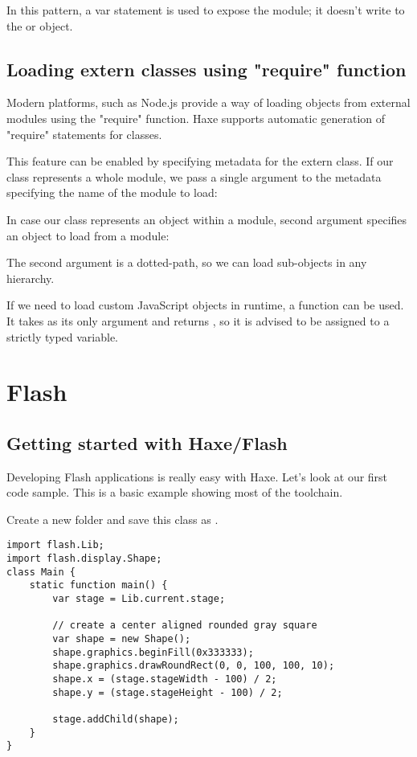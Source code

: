 In this pattern, a var statement is used to expose the module; it doesn't write to the  or  object. 

\subsection{Loading extern classes using "require" function}
\label{target-javascript-require}

Modern  platforms, such as Node.js provide a way of loading objects
from external modules using the "require" function. Haxe supports automatic generation
of "require" statements for  classes.

This feature can be enabled by specifying  metadata for the extern class. If our  class represents a whole module, we pass a single argument to the  metadata specifying the name of the module to load:


In case our  class represents an object within a module, second  argument specifies an object to load from a module:


The second argument is a dotted-path, so we can load sub-objects in any hierarchy.

If we need to load custom JavaScript objects in runtime, a  function can be used. It takes  as its only argument and returns , so it is advised to be assigned to a strictly typed variable.

\section{Flash}
\label{target-flash}

\subsection{Getting started with Haxe/Flash}
\label{target-flash-getting-started}

Developing Flash applications is really easy with Haxe. Let's look at our first code sample.
This is a basic example showing most of the toolchain. 

Create a new folder and save this class as .

\begin{lstlisting}
import flash.Lib;
import flash.display.Shape;
class Main {
    static function main() {
        var stage = Lib.current.stage;
        
        // create a center aligned rounded gray square
        var shape = new Shape();
        shape.graphics.beginFill(0x333333);
		shape.graphics.drawRoundRect(0, 0, 100, 100, 10);
		shape.x = (stage.stageWidth - 100) / 2;
		shape.y = (stage.stageHeight - 100) / 2;
		
		stage.addChild(shape);
    }    
}
\end{lstlisting}

